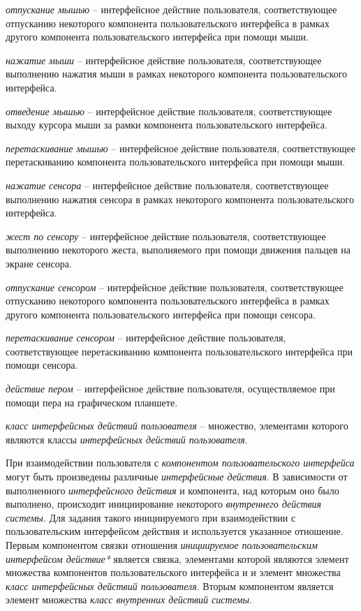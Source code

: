 \textit{отпускание мышью} -- интерфейсное действие пользователя, соответствующее отпусканию некоторого компонента пользовательского интерфейса в рамках другого компонента пользовательского интерфейса при помощи мыши.

\textit{нажатие мыши} -- интерфейсное действие пользователя, соответствующее выполнению нажатия мыши в рамках некоторого компонента пользовательского интерфейса.

\textit{отведение мышью} -- интерфейсное действие пользователя, соответствующее выходу курсора мыши за рамки компонента пользовательского интерфейса.

\textit{перетаскивание мышью} -- интерфейсное действие пользователя, соответствующее перетаскиванию компонента пользовательского интерфейса при помощи мыши.

\textit{нажатие сенсора} -- интерфейсное действие пользователя, соответствующее выполнению нажатия сенсора в рамках некоторого компонента пользовательского интерфейса.

\textit{жест по сенсору} -- интерфейсное действие пользователя, соответствующее выполнению некоторого жеста, выполняемого при помощи движения пальцев на экране сенсора.

\textit{отпускание сенсором} -- интерфейсное действие пользователя, соответствующее отпусканию некоторого компонента пользовательского интерфейса в рамках другого компонента пользовательского интерфейса при помощи сенсора.

\textit{перетаскивание сенсором} -- интерфейсное действие пользователя, соответствующее перетаскиванию компонента пользовательского интерфейса при помощи сенсора.

\textit{действие пером} -- интерфейсное действие пользователя, осуществляемое при помощи пера на графическом планшете.

\textit{класс интерфейсных действий пользователя} -- множество, элементами которого являются классы \textit{интерфейсных действий пользователя}.

При взаимодействии пользователя с \textit{компонентом пользовательского интерфейса} могут быть произведены различные \textit{интерфейсные действия}. В зависимости от выполненного \textit{интерфейсного действия} и компонента, над которым оно было выполнено, происходит инициирование некоторого \textit{внутреннего действия системы}. Для задания такого инициируемого при взаимодействии с пользовательским интерфейсом действия и используется указанное отношение. Первым компонентом связки отношения \textit{инициируемое пользовательским интерфейсом действие*} является связка, элементами которой являются элемент множества компонентов пользовательского интерфейса и и элемент множества \textit{класс интерфейсных действий пользователя}. Вторым компонентом является элемент множества \textit{класс внутренних действий системы}.

